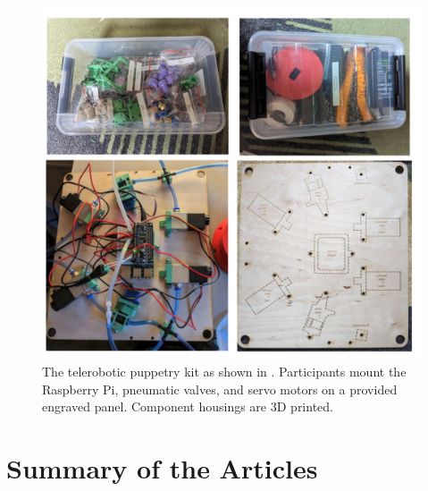 \documentclass[dissertation,math,vertlayout,pdfa,colorlinks]{aaltoseries}
\begin{document}
\begin{figure}
    \centering
    \includegraphics[width=1\linewidth]{puppetry-kit.png}
    \caption{The telerobotic puppetry kit as shown in \cite{peledTeleroboticTheaterOppressed2025}. Participants mount the Raspberry Pi, pneumatic valves, and servo motors on a provided engraved panel. Component housings are 3D printed.}
    \label{fig:telepupetry-kit}
\end{figure}

\chapter{Summary of the Articles}
\end{document}
